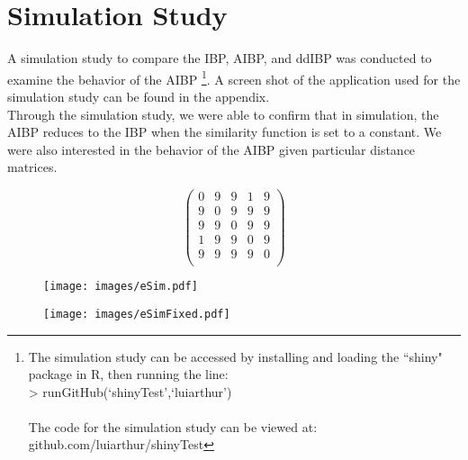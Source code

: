\section{Simulation Study}
A simulation study to compare the IBP, AIBP, and ddIBP was conducted to examine
the behavior of the AIBP
\footnote{The simulation study can be accessed by installing and loading the
``shiny" package in R, then running the line: \\
> runGitHub(`shinyTest',`luiarthur')\\\\
The code for the simulation study can be viewed at: \\
github.com/luiarthur/shinyTest}. A screen shot of the application used for the 
simulation study can be found in the appendix. \\
\noindent
Through the simulation study, we were able to confirm that in simulation, the
AIBP reduces to the IBP when the similarity function is set to a constant. We 
were also interested in the behavior of the AIBP given particular distance 
matrices. 

\begin{table}[ht]
\centering
\[
  \begin{pmatrix}{}
    0 & 9 & 9 & 1 & 9 \\ 
    9 & 0 & 9 & 9 & 9 \\ 
    9 & 9 & 0 & 9 & 9 \\ 
    1 & 9 & 9 & 0 & 9 \\ 
    9 & 9 & 9 & 9 & 0 \\ 
  \end{pmatrix}
\]
\end{table}


\begin{figure}\begin{center}
  \texttt{[image: images/eSim.pdf]}
  \caption{}
\end{center}\end{figure}


\begin{figure}\begin{center}
  \texttt{[image: images/eSimFixed.pdf]}
  \caption{}
\end{center}\end{figure}


